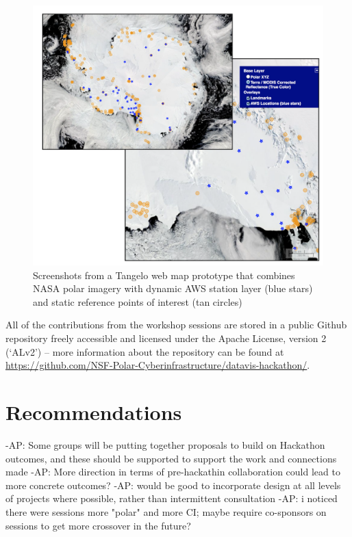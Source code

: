 \documentclass[11pt]{article}
\begin{document}
\begin{figure}[htp]
    \centering
    \includegraphics[width=5in]{figs/fig5.png}
    \caption{Screenshots from a Tangelo web map prototype that combines NASA polar imagery with dynamic AWS station layer (blue stars) and static reference points of interest (tan circles)}
    \label{fig:website}
\end{figure}

All of the contributions from the workshop sessions are stored in a public Github repository freely accessible and licensed under the Apache License, version 2 (`ALv2') -- more information about the repository can be found at \url{https://github.com/NSF-Polar-Cyberinfrastructure/datavis-hackathon/}. 

\section{Recommendations}
-AP: Some groups will be putting together proposals to build on Hackathon outcomes, and these should be supported to support the work and connections made
-AP: More direction in terms of pre-hackathin collaboration could lead to more concrete outcomes?
-AP: would be good to incorporate design at all levels of projects where possible, rather than intermittent consultation
-AP: i noticed there were sessions more "polar" and more CI; maybe require co-sponsors on sessions to get more crossover in the future?
\end{document}
